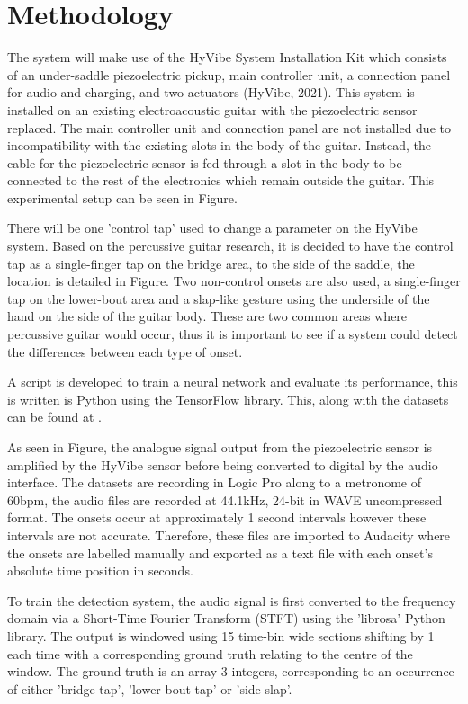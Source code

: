 \documentclass[conference]{IEEEtran}
\begin{document}
\section{Methodology}
The system will make use of the HyVibe System Installation Kit which consists of an under-saddle piezoelectric pickup, main controller unit, a connection panel for audio and charging, and two actuators (HyVibe, 2021).
This system is installed on an existing electroacoustic guitar with the piezoelectric sensor replaced. The main controller unit and connection panel are not installed due to incompatibility with the existing slots in
the body of the guitar. Instead, the cable for the piezoelectric sensor is fed through a slot in the body to be connected to the rest of the electronics which remain outside the guitar. This experimental setup can be
seen in Figure. 

There will be one 'control tap' used to change a parameter on the HyVibe system. Based on the percussive guitar research, it is decided to have the control tap as a single-finger tap on the bridge area, to the side of
the saddle, the location is detailed in Figure. Two non-control onsets are also used, a single-finger tap on the lower-bout area and a slap-like gesture using the underside of the hand on the side of the guitar body. These are two common areas where percussive guitar would occur, thus
it is important to see if a system could detect the differences between each type of onset.

A script is developed to train a neural network and evaluate its performance, this is written is Python using the TensorFlow library. This, along with the datasets can be found at .

As seen in Figure, the analogue signal output from the piezoelectric sensor is amplified by the HyVibe sensor before being converted to digital by the audio interface. The datasets are recording in Logic Pro along to
a metronome of 60bpm, the audio files are recorded at 44.1kHz, 24-bit in WAVE uncompressed format. The onsets occur at approximately 1 second intervals however these intervals are not accurate. Therefore, these files are imported 
to Audacity where the onsets are labelled manually and exported as a text file with each onset's absolute time position in seconds.

To train the detection system, the audio signal is first converted to the frequency domain via a Short-Time Fourier Transform (STFT) using the 'librosa' Python library. The output is windowed
using 15 time-bin wide sections shifting by 1 each time with a corresponding ground truth relating to the centre of the window. The ground truth is an array 3 integers, corresponding to an occurrence of either 'bridge tap', 'lower bout tap' or
'side slap'. 
\end{document}
